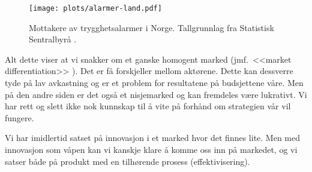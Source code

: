 \begin{figure}
  \texttt{[image: plots/alarmer-land.pdf]}
  \caption{Mottakere av trygghetsalarmer i Norge.
    Tallgrunnlag fra Statistisk Sentralbyrå \cite{iplos.2013, ssb.trygghetsalarm}.}
  \label{fig.mottakere}
\end{figure}

Alt dette viser at vi snakker om et ganske homogent marked (jmf.~<<market
differentiation>> \cite[s.~510]{bessant}).  Det er få forskjeller mellom
aktørene.  Dette kan dessverre tyde på lav avkastning og er et problem for
resultatene på budsjettene våre.  Men på den andre siden er det også et
nisjemarked og kan fremdeles være lukrativt. Vi har rett og slett ikke nok
kunnskap til å vite på forhånd om strategien vår vil fungere. 

Vi har imidlertid satset på innovasjon i et marked hvor det finnes lite.  Men
med innovasjon som våpen kan vi kanskje klare å komme oss inn på markedet, og
vi satser både på produkt med en tilhørende prosess (effektivisering).






